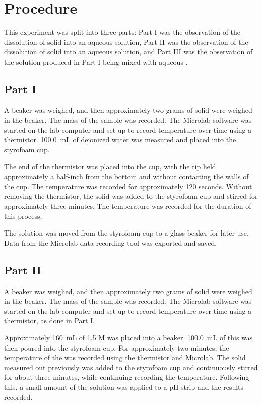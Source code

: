 \section{Procedure}

This experiment was split into three parts:
Part I was the observation of the dissolution of solid \koh into an aqueous solution,
Part II was the observation of the dissolution of solid \koh into an aqueous \hcl solution,
and Part III was the observation of the solution produced in Part I being mixed with aqueous \hcl.

\subsection*{Part I}
A beaker was weighed, and then approximately two grams of solid \koh were weighed in the beaker. 
The mass of the \koh sample was recorded. 
The Microlab software was started on the lab computer and set up to record temperature over time using a thermistor. 
\SI{100.0}{mL} of deionized water was measured and placed into the styrofoam cup. 

The end of the thermistor was placed into the cup, with the tip held approximately a half-inch from the bottom and without contacting the walls of the cup. 
The temperature was recorded for approximately 120 seconds.  
Without removing the thermistor, the solid \koh was added to the styrofoam cup and stirred for approximately three minutes. 
The temperature was recorded for the duration of this process.

The solution was moved from the styrofoam cup to a glass beaker for later use. 
Data from the Microlab data recording tool was exported and saved. 

\subsection*{Part II}
A beaker was weighed, and then approximately two grams of solid \koh were weighed in the beaker. 
The mass of the \koh sample was recorded. 
The Microlab software was started on the lab computer and set up to record temperature over time using a thermistor, as done in Part I.

Approximately \SI{160}{mL} of 1.5 M \hcl was placed into a beaker.
 \SI{100.0}{mL} of this was then poured into the styrofoam cup.
For approximately two minutes, the temperature of the \hcl was recorded using the thermistor and Microlab.
The solid \koh measured out previously was added to the styrofoam cup and continuously stirred for about three minutes,
while continuing recording the temperature. Following this, a small amount of the solution was applied to a pH strip and the results recorded. 

